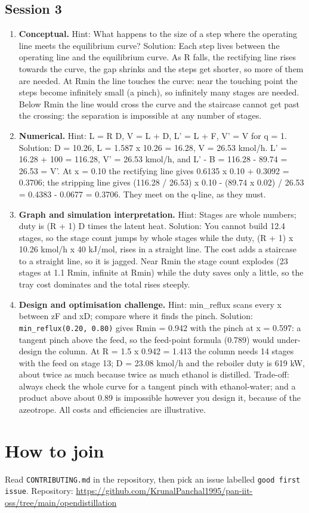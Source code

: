 \documentclass[11pt,a4paper]{article}
\begin{document}
\subsection*{Session 3}
\begin{enumerate}[nosep]
\item \textbf{Conceptual.} Hint: What happens to the size of a step where the operating line meets the equilibrium curve? Solution: Each step lives between the operating line and the equilibrium curve. As R falls, the rectifying line rises towards the curve, the gap shrinks and the steps get shorter, so more of them are needed. At Rmin the line touches the curve: near the touching point the steps become infinitely small (a pinch), so infinitely many stages are needed. Below Rmin the line would cross the curve and the staircase cannot get past the crossing: the separation is impossible at any number of stages.
\item \textbf{Numerical.} Hint: L = R D, V = L + D, L' = L + F, V' = V for q = 1. Solution: D = 10.26, L = 1.587 x 10.26 = 16.28, V = 26.53 kmol/h. L' = 16.28 + 100 = 116.28, V' = 26.53 kmol/h, and L' - B = 116.28 - 89.74 = 26.53 = V'. At x = 0.10 the rectifying line gives 0.6135 x 0.10 + 0.3092 = 0.3706; the stripping line gives (116.28 / 26.53) x 0.10 - (89.74 x 0.02) / 26.53 = 0.4383 - 0.0677 = 0.3706. They meet on the q-line, as they must.
\item \textbf{Graph and simulation interpretation.} Hint: Stages are whole numbers; duty is (R + 1) D times the latent heat. Solution: You cannot build 12.4 stages, so the stage count jumps by whole stages while the duty, (R + 1) x 10.26 kmol/h x 40 kJ/mol, rises in a straight line. The cost adds a staircase to a straight line, so it is jagged. Near Rmin the stage count explodes (23 stages at 1.1 Rmin, infinite at Rmin) while the duty saves only a little, so the tray cost dominates and the total rises steeply.
\item \textbf{Design and optimisation challenge.} Hint: min\_reflux scans every x between zF and xD; compare where it finds the pinch. Solution: \texttt{min\_reflux(0.20, 0.80)} gives Rmin = 0.942 with the pinch at x = 0.597: a tangent pinch above the feed, so the feed-point formula (0.789) would under-design the column. At R = 1.5 x 0.942 = 1.413 the column needs 14 stages with the feed on stage 13; D = 23.08 kmol/h and the reboiler duty is 619 kW, about twice as much because twice as much ethanol is distilled. Trade-off: always check the whole curve for a tangent pinch with ethanol-water; and a product above about 0.89 is impossible however you design it, because of the azeotrope. All costs and efficiencies are illustrative.
\end{enumerate}

\section{How to join}
Read \texttt{CONTRIBUTING.md} in the repository, then pick an issue labelled \texttt{good first issue}. Repository: \url{https://github.com/KrunalPanchal1995/pan-iit-oss/tree/main/opendistillation}
\end{document}

